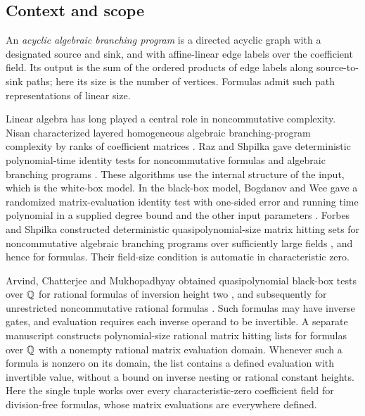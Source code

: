 \subsection{Context and scope}

An \emph{acyclic algebraic branching program} is a directed acyclic graph
with a designated source and sink, and with affine-linear edge labels
over the coefficient field. Its output is the sum of the ordered products
of edge labels along source-to-sink paths; here its size is the number
of vertices. Formulas admit such path representations of linear size.

Linear algebra has long played a central role in noncommutative complexity.
Nisan characterized layered homogeneous algebraic branching-program complexity by
ranks of coefficient matrices \cite[Theorem~1]{Nisan1991}.
Raz and Shpilka gave deterministic polynomial-time identity tests for
noncommutative formulas and algebraic branching programs
\cite[Theorems~4 and~5]{RazShpilka2005}. These algorithms use the internal structure
of the input, which is the white-box model. In the black-box model,
Bogdanov and Wee gave a randomized matrix-evaluation identity test with
one-sided error and running time polynomial in a supplied degree bound
and the other input parameters
\cite[Theorem~4.2]{BogdanovWee2005}.
Forbes and Shpilka constructed deterministic
quasipolynomial-size matrix hitting sets for noncommutative algebraic branching
programs over sufficiently large fields
\cite[Corollary~4.7]{ForbesShpilka2013}, and hence for formulas.
Their field-size condition is automatic in characteristic zero.

Arvind, Chatterjee and Mukhopadhyay obtained quasipolynomial black-box
tests over $\mathbb{Q}$ for rational formulas of inversion height two
\cite[Theorem~1.1]{ArvindChatterjeeMukhopadhyay2022}, and subsequently for
unrestricted noncommutative rational formulas
\cite[Theorem~2 and Corollary~3]{ArvindChatterjeeMukhopadhyay2026}.
Such formulas may have inverse gates, and evaluation requires each inverse
operand to be invertible. A separate manuscript
\cite[Theorem~1.1]{OpenAIRationalFormulas2026} constructs polynomial-size
rational matrix hitting lists for formulas over $\mathbb{Q}$ with a nonempty
rational matrix evaluation domain. Whenever such a formula is nonzero
on its domain, the list contains a defined evaluation with invertible
value, without a bound on inverse nesting or rational constant heights.
Here the single tuple works over every characteristic-zero coefficient
field for division-free formulas, whose matrix evaluations are everywhere
defined.

